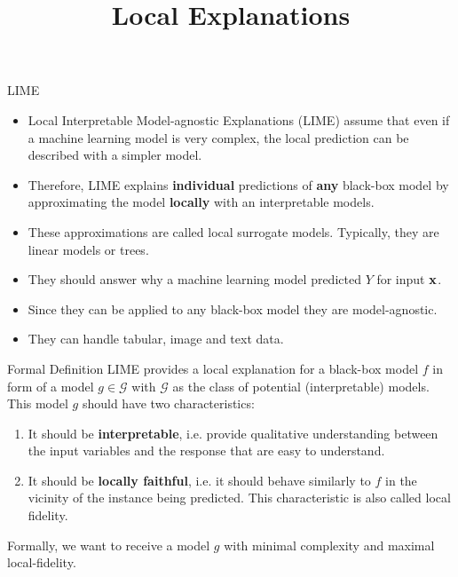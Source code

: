 \documentclass[11pt,compress,t,notes=noshow, xcolor=table]{beamer}
\title{Local Explanations}
\institute{\href{https://compstat-lmu.github.io/lecture_i2ml/}{compstat-lmu.github.io/lecture\_i2ml}}
\date{}
\newcommand{\Gspace}{\mathcal{G}}
\begin{document}
	
	
	
	
	
	
	
	
	

\begin{vbframe}{LIME}
\begin{itemize}
		\item Local Interpretable Model-agnostic Explanations (LIME) assume that even if a machine learning model is very complex, the local prediction can be described with a simpler model.
		\item  Therefore, LIME explains \textbf{individual} predictions of \textbf{any} black-box model by approximating the model \textbf{locally} with an interpretable models.
		\item These approximations are called local surrogate models. Typically, they are linear models or trees.
		\item They should answer why a machine learning model predicted $Y$ for input $\xv$.
		\item Since they can be applied to any black-box model they are model-agnostic.  
		\item They can handle tabular, image and text data. 
\end{itemize}
\end{vbframe}

\begin{vbframe}{Formal Definition}
	LIME provides a local explanation for a black-box model $f$ in form of a model $g \in \Gspace$ with $\Gspace$ as the class of potential (interpretable) models. This model $g$ should have two characteristics:
	\begin{enumerate}
		\item It should be \textbf{interpretable}, i.e. provide qualitative understanding between the input variables and the response that are easy to understand.  
		\item It should be \textbf{locally faithful}, i.e. it should behave similarly to $f$ in the vicinity of the instance being predicted. This characteristic is also called local fidelity. 
	\end{enumerate}
	Formally, we want to receive a model $g$ with minimal complexity and maximal local-fidelity. 
\end{vbframe}
\end{document}
